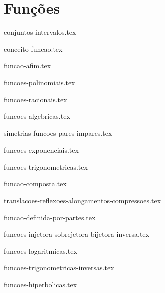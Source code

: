 \part{Funções}

{conjuntos-intervalos.tex}

{conceito-funcao.tex}

{funcao-afim.tex}

{funcoes-polinomiais.tex}

{funcoes-racionais.tex}

{funcoes-algebricas.tex}

{simetrias-funcoes-pares-impares.tex}

{funcoes-exponenciais.tex}

{funcoes-trigonometricas.tex}

{funcao-composta.tex}

{translacoes-reflexoes-alongamentos-compressoes.tex}

{funcao-definida-por-partes.tex}

{funcoes-injetora-sobrejetora-bijetora-inversa.tex}

{funcoes-logaritmicas.tex}

{funcoes-trigonometricas-inversas.tex}

{funcoes-hiperbolicas.tex}
